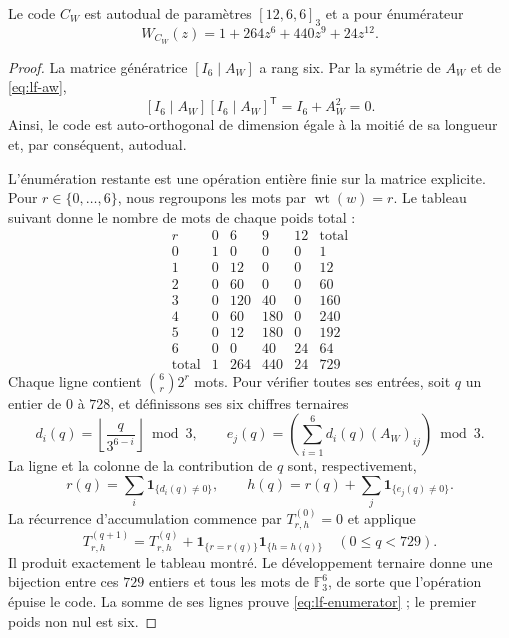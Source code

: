 \begin{theorem}
\label{thm:lf-code}
Le code \(C_W\) est autodual de paramètres \([12,6,6]_3\) et
a pour énumérateur
\begin{equation}
 W_{C_W}(z)=1+264z^6+440z^9+24z^{12}.
 \label{eq:lf-enumerator}
\end{equation}
\end{theorem}
\begin{proof}
La matrice génératrice \([I_6\mid A_W]\) a rang six.
Par la symétrie de \(A_W\) et de \eqref{eq:lf-aw},
\[
 [I_6\mid A_W][I_6\mid A_W]^{\mathsf T}
       =I_6+A_W^2=0.
\]
Ainsi, le code est auto-orthogonal de dimension égale à la moitié de sa longueur et, par conséquent, autodual.

L’énumération restante est une opération entière finie sur
la matrice explicite. Pour \(r\in\{0,\ldots,6\}\), nous regroupons
les mots par \(\operatorname{wt}(w)=r\). Le tableau suivant
donne le nombre de mots de chaque poids total :
\[
\begin{array}{c|rrrr|r}
r&0&6&9&12&\text{total}\\ \hline
0&1&0&0&0&1\\
1&0&12&0&0&12\\
2&0&60&0&0&60\\
3&0&120&40&0&160\\
4&0&60&180&0&240\\
5&0&12&180&0&192\\
6&0&0&40&24&64\\ \hline
\text{total}&1&264&440&24&729
\end{array}
\]
Chaque ligne contient \(\binom6r2^r\) mots. Pour vérifier
toutes ses entrées, soit \(q\) un entier de \(0\) à \(728\), et
définissons ses six chiffres ternaires
\[
 d_i(q)=\left\lfloor\frac{q}{3^{6-i}}\right\rfloor\bmod3,
 \qquad
 e_j(q)=\left(\sum_{i=1}^{6}d_i(q)(A_W)_{ij}\right)\bmod3.
\]
La ligne et la colonne de la contribution de \(q\) sont, respectivement,
\[
 r(q)=\sum_i\mathbf1_{\{d_i(q)\ne0\}},\qquad
 h(q)=r(q)+\sum_j\mathbf1_{\{e_j(q)\ne0\}}.
\]
La récurrence d'accumulation commence par \(T^{(0)}_{r,h}=0\) et applique
\[
 T^{(q+1)}_{r,h}
 =T^{(q)}_{r,h}
   +\mathbf1_{\{r=r(q)\}}\mathbf1_{\{h=h(q)\}}
 \quad(0\leq q<729).
\]
Il produit exactement le tableau montré. Le développement ternaire
donne une bijection entre ces \(729\) entiers et tous les mots
de \(\mathbb F_3^6\), de sorte que l’opération épuise le code.
La somme de ses lignes prouve \eqref{eq:lf-enumerator} ; le premier
poids non nul est six.
\end{proof}

